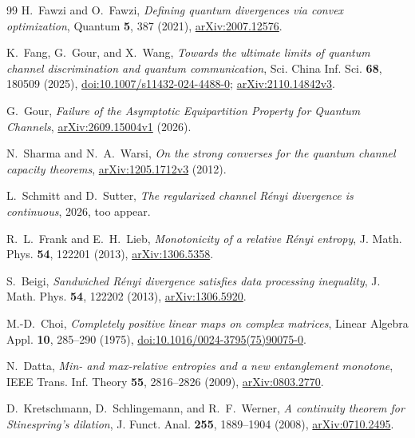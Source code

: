 \documentclass[11pt,letterpaper]{article}
\numberwithin{equation}{section}
\begin{document}
\begin{thebibliography}{99}
H.~Fawzi and O.~Fawzi, \emph{Defining quantum divergences via convex optimization},
Quantum \textbf{5}, 387 (2021),
\href{https://arxiv.org/abs/2007.12576}{arXiv:2007.12576}.

K.~Fang, G.~Gour, and X.~Wang,
\emph{Towards the ultimate limits of quantum channel discrimination and quantum communication},
Sci. China Inf. Sci. \textbf{68}, 180509 (2025),
\href{https://doi.org/10.1007/s11432-024-4488-0}{doi:10.1007/s11432-024-4488-0};
\href{https://arxiv.org/abs/2110.14842v3}{arXiv:2110.14842v3}.

G.~Gour, \emph{Failure of the Asymptotic Equipartition Property for Quantum Channels},
\href{https://arxiv.org/abs/2609.15004v1}{arXiv:2609.15004v1} (2026).

N.~Sharma and N.~A.~Warsi,
\emph{On the strong converses for the quantum channel capacity theorems},
\href{https://arxiv.org/abs/1205.1712v3}{arXiv:1205.1712v3} (2012).

L.~Schmitt and D.~Sutter, \emph{The regularized channel R\'enyi divergence is continuous}, 2026, too appear.

R.~L.~Frank and E.~H.~Lieb, \emph{Monotonicity of a relative R\'enyi entropy},
J. Math. Phys. \textbf{54}, 122201 (2013),
\href{https://arxiv.org/abs/1306.5358}{arXiv:1306.5358}.

S.~Beigi, \emph{Sandwiched R\'enyi divergence satisfies data processing inequality},
J. Math. Phys. \textbf{54}, 122202 (2013),
\href{https://arxiv.org/abs/1306.5920}{arXiv:1306.5920}.

M.-D.~Choi, \emph{Completely positive linear maps on complex matrices},
Linear Algebra Appl. \textbf{10}, 285--290 (1975),
\href{https://doi.org/10.1016/0024-3795(75)90075-0}{doi:10.1016/0024-3795(75)90075-0}.

N.~Datta, \emph{Min- and max-relative entropies and a new entanglement monotone},
IEEE Trans. Inf. Theory \textbf{55}, 2816--2826 (2009),
\href{https://arxiv.org/abs/0803.2770}{arXiv:0803.2770}.

D.~Kretschmann, D.~Schlingemann, and R.~F.~Werner,
\emph{A continuity theorem for Stinespring's dilation},
J. Funct. Anal. \textbf{255}, 1889--1904 (2008),
\href{https://arxiv.org/abs/0710.2495}{arXiv:0710.2495}.

\end{thebibliography}
\endgroup
\end{document}
